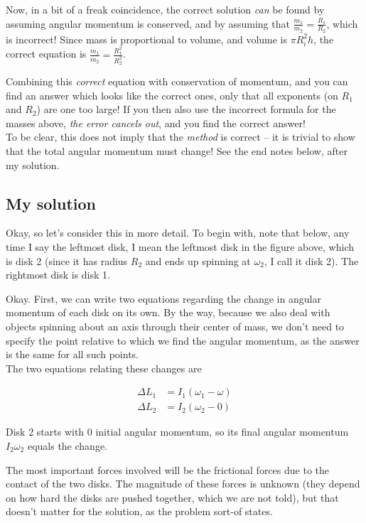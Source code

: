 \documentclass[8.01x]{subfiles}
\begin{document}
Now, in a bit of a freak coincidence, the correct solution \emph{can} be found by assuming angular momentum is conserved, and by assuming that $\displaystyle \frac{m_1}{m_2} = \frac{R_1}{R_2}$, which is incorrect! Since mass is proportional to volume, and volume is $\pi R_i^2 h$, the correct equation is $\displaystyle \frac{m_1}{m_2} = \frac{R_1^2}{R_2^2}$.

Combining this \emph{correct} equation with conservation of momentum, and you can find an answer which looks like the correct ones, only that all exponents (on $R_1$ and $R_2$) are one too large! If you then also use the incorrect formula for the masses above, \emph{the error cancels out}, and you find the correct answer!\\
To be clear, this does not imply that the \emph{method} is correct -- it is trivial to show that the total angular momentum must change! See the end notes below, after my solution.

\subsection{My solution}

Okay, so let's consider this in more detail. To begin with, note that below, any time I say the leftmost disk, I mean the leftmost disk in the figure above, which is disk 2 (since it has radius $R_2$ and ends up spinning at $\omega_2$, I call it disk 2). The rightmost disk is disk 1.

Okay. First, we can write two equations regarding the change in angular momentum of each disk on its own. By the way, because we also deal with objects spinning about an axis through their center of mass, we don't need to specify the point relative to which we find the angular momentum, as the answer is the same for all such points.\\
The two equations relating these changes are

\begin{align}
\Delta L_1 &= I_1(\omega_1 - \omega)\\
\Delta L_2 &= I_2(\omega_2 - 0)
\end{align}

Disk 2 starts with 0 initial angular momentum, so its final angular momentum $I_2 \omega_2$ equals the change.

The most important forces involved will be the frictional forces due to the contact of the two disks. The magnitude of these forces is unknown (they depend on how hard the disks are pushed together, which we are not told), but that doesn't matter for the solution, as the problem sort-of states.
\end{document}
